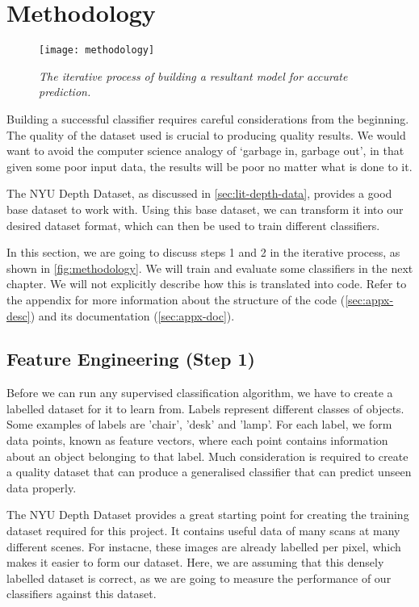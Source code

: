 \chapter{Methodology} \label{chap:methodology}

\begin{figure}[H]
  \centering
  \texttt{[image: methodology]}
  \caption{\textit{The iterative process of building a resultant model for accurate prediction.}}
  \label{fig:methodology}
\end{figure} 

Building a successful classifier requires careful considerations from the beginning. The quality of the dataset used is crucial to producing quality results. We would want to avoid the computer science analogy of `garbage in, garbage out', in that given some poor input data, the results will be poor no matter what is done to it. 

The NYU Depth Dataset, as discussed in \autoref{sec:lit-depth-data}, provides a good base dataset to work with. Using this base dataset, we can transform it into our desired dataset format, which can then be used to train different classifiers. 

In this section, we are going to discuss steps 1 and 2 in the iterative process, as shown in \autoref{fig:methodology}. We will train and evaluate some classifiers in the next chapter. We will not explicitly describe how this is translated into code. Refer to the appendix for more information about the structure of the code (\autoref{sec:appx-desc}) and its documentation (\autoref{sec:appx-doc}). 


\newpage
\section{Feature Engineering (Step 1)}
Before we can run any supervised classification algorithm, we have to create a labelled dataset for it to learn from. Labels represent different classes of objects. Some examples of labels are 'chair', 'desk' and 'lamp'. For each label, we form data points, known as feature vectors, where each point contains information about an object belonging to that label. Much consideration is required to create a quality dataset that can produce a generalised classifier that can predict unseen data properly.

The NYU Depth Dataset provides a great starting point for creating the training dataset required for this project. It contains useful data of many scans at many different scenes. For instacne, these images are already labelled per pixel, which makes it easier to form our dataset. Here, we are assuming that this densely labelled dataset is correct, as we are going to measure the performance of our classifiers against this dataset.

